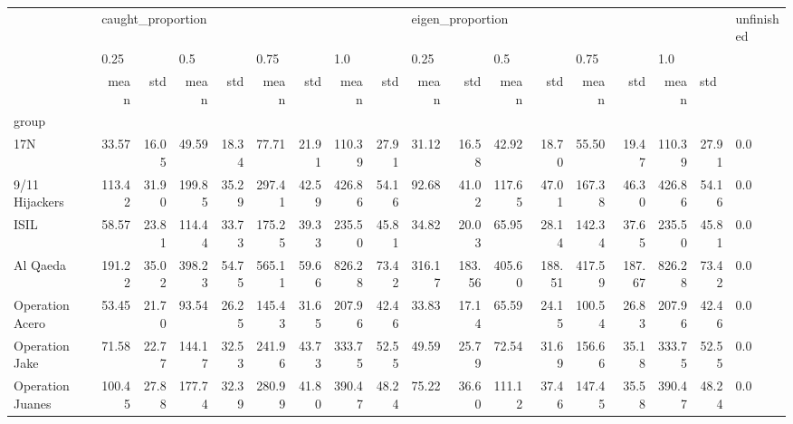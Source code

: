 \begin{tabular}{lrrrrrrrrrrrrrrrrl}
\toprule
{} & \multicolumn{8}{l}{caught\_proportion} & \multicolumn{8}{l}{eigen\_proportion} & unfinished \\
{} & \multicolumn{2}{l}{0.25} & \multicolumn{2}{l}{0.5} & \multicolumn{2}{l}{0.75} & \multicolumn{2}{l}{1.0} & \multicolumn{2}{l}{0.25} & \multicolumn{2}{l}{0.5} & \multicolumn{2}{l}{0.75} & \multicolumn{3}{l}{1.0} \\
{} &              mean &    std &    mean &    std &    mean &    std &    mean &    std &             mean &     std &    mean &     std &    mean &     std &    mean & \multicolumn{2}{l}{std} \\
group                &                   &        &         &        &         &        &         &        &                  &         &         &         &         &         &         &        &            \\
\midrule
17N                  &             33.57 &  16.05 &   49.59 &  18.34 &   77.71 &  21.91 &  110.39 &  27.91 &            31.12 &   16.58 &   42.92 &   18.70 &   55.50 &   19.47 &  110.39 &  27.91 &        0.0 \\
9/11 Hijackers       &            113.42 &  31.90 &  199.85 &  35.29 &  297.41 &  42.59 &  426.86 &  54.16 &            92.68 &   41.02 &  117.65 &   47.01 &  167.38 &   46.30 &  426.86 &  54.16 &        0.0 \\
ISIL                 &             58.57 &  23.81 &  114.44 &  33.73 &  175.25 &  39.33 &  235.50 &  45.81 &            34.82 &   20.03 &   65.95 &   28.14 &  142.34 &   37.65 &  235.50 &  45.81 &        0.0 \\
Al Qaeda             &            191.22 &  35.02 &  398.23 &  54.75 &  565.11 &  59.66 &  826.28 &  73.42 &           316.17 &  183.56 &  405.60 &  188.51 &  417.59 &  187.67 &  826.28 &  73.42 &        0.0 \\
Operation Acero      &             53.45 &  21.70 &   93.54 &  26.25 &  145.43 &  31.65 &  207.96 &  42.46 &            33.83 &   17.14 &   65.59 &   24.15 &  100.54 &   26.83 &  207.96 &  42.46 &        0.0 \\
Operation Jake       &             71.58 &  22.77 &  144.17 &  32.53 &  241.96 &  43.73 &  333.75 &  52.55 &            49.59 &   25.79 &   72.54 &   31.69 &  156.66 &   35.18 &  333.75 &  52.55 &        0.0 \\
Operation Juanes     &            100.45 &  27.88 &  177.74 &  32.39 &  280.99 &  41.80 &  390.47 &  48.24 &            75.22 &   36.60 &  111.12 &   37.46 &  147.45 &   35.58 &  390.47 &  48.24 &        0.0 \\

\end{tabular}

